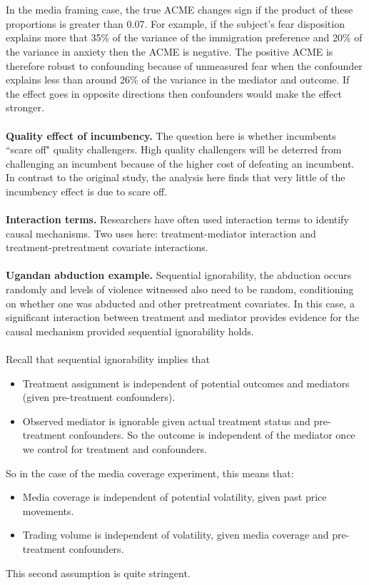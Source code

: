 \documentclass{article}
\begin{document}
	\\~\\
	In the media framing case, the true ACME changes sign if the product of these proportions is greater than 0.07. For example, if the subject's fear disposition explains more that 35\% of the variance of the immigration preference and 20\% of the variance in anxiety then the ACME is negative. The positive ACME is therefore robust to confounding because of unmeasured fear when the confounder explains less than around 26\% of the variance in the mediator and outcome. If the effect goes in opposite directions then confounders would make the effect stronger. 
	\\~\\
	\textbf{Quality effect of incumbency.} The question here is whether incumbents ``scare off" quality challengers. High quality challengers will be deterred from challenging an incumbent because of the higher cost of defeating an incumbent. In contrast to the original study, the analysis here finds that very little of the incumbency effect is due to scare off. 
	\\
	
	
	
	
	~\\
	\textbf{Interaction terms.} Researchers have often used interaction terms to identify causal mechanisms. Two uses here: treatment-mediator interaction and treatment-pretreatment covariate interactions. 
	\\~\\
	\textbf{Ugandan abduction example.} Sequential ignorability, the abduction occurs randomly and levels of violence witnessed also need to be random, conditioning on whether one was abducted and other pretreatment covariates. In this case, a significant interaction between treatment and mediator provides evidence for the causal mechanism provided sequential ignorability holds. 
	\\~\\
	Recall that sequential ignorability implies that 
	\begin{itemize}
		\item Treatment assignment is independent of potential outcomes and mediators (given pre-treatment confounders). 
		\item Observed mediator is ignorable given actual treatment status and pre-treatment confounders. So the outcome is independent of the mediator once we control for treatment and confounders. 
	\end{itemize}
	So in the case of the media coverage experiment, this means that: 
	\begin{itemize}
		\item Media coverage is independent of potential volatility, given past price movements. 
		\item Trading volume is independent of volatility, given media coverage and pre-treatment confounders. 
	\end{itemize}
	This second assumption is quite stringent.
	
\end{document}
